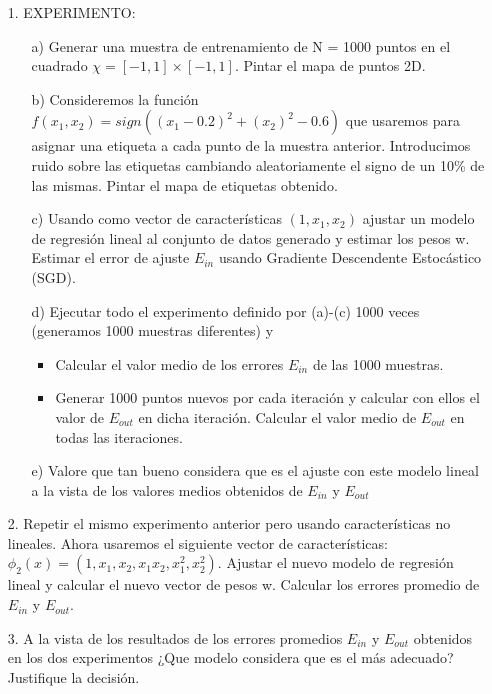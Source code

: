 \documentclass[a4paper,11pt]{article}
\begin{document}
\begin{itemize}
\item[1.] EXPERIMENTO:
\begin{enumerate}
\item[a)]Generar una muestra de entrenamiento de N = 1000 puntos en el cuadrado $\chi = [-1, 1] \times [-1, 1]$. Pintar el mapa de puntos 2D.
\item[b)]Consideremos la función $f(x_1, x_2) = sign((x_1 - 0.2)^{2} + (x_2)^{2}- 0.6)$ que usaremos para asignar una etiqueta a cada punto de la muestra anterior. Introducimos ruido sobre las etiquetas cambiando aleatoriamente el signo de un 10\% de las mismas. Pintar el mapa de etiquetas obtenido.
\item[c)]Usando como vector de características $(1, x_1, x_2)$ ajustar un modelo de regresión lineal al conjunto de datos generado y estimar los pesos w. Estimar el error de ajuste $E_{in}$ usando Gradiente Descendente Estocástico (SGD).
\item[d)]Ejecutar todo el experimento definido por (a)-(c) 1000 veces (generamos 1000 muestras diferentes) y
\begin{itemize}
\item Calcular el valor medio de los errores $E_{in}$ de las 1000 muestras.
\item Generar 1000 puntos nuevos por cada iteración y calcular con ellos el valor de $E_{out}$ en dicha iteración. Calcular el valor medio de $E_{out}$ en todas las iteraciones.
\end{itemize}
\item[e)]Valore que tan bueno considera que es el ajuste con este modelo lineal a la vista de los valores medios obtenidos de $E_{in}$ y $E_{out}$
\end{enumerate}
\item[2.] Repetir el mismo experimento anterior pero usando características no lineales. Ahora usaremos el siguiente vector de características: $\phi_2(x) = (1, x_1, x_2, x_1x_2, x_1^{2}, x_2^{2})$. Ajustar el nuevo modelo de regresión lineal y calcular el nuevo vector de pesos w. Calcular los errores promedio de $E_{in}$ y $E_{out}$.
\item[3.] A la vista de los resultados de los errores promedios $E_{in}$ y $E_{out}$ obtenidos en los dos experimentos ¿Que modelo considera que es el más adecuado? Justifique la decisión.
\end{itemize}
\end{document}
